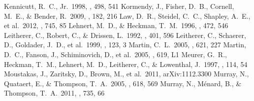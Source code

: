 \documentclass[apj]{emulateapj}
\begin{document}
\begin{thebibliography}{}
 Kennicutt, R.~C., Jr.\ 1998, \apj,
  498, 541
 Kormendy, J., Fisher, D.~B.,
  Cornell, M.~E., \& Bender, R.\ 2009, \apjs, 182, 216
 Law, D.~R., Steidel, C.~C., Shapley,
  A.~E., et al.\ 2012, \apj, 745, 85
 Lehnert, M.~D., \& Heckman,
  T.~M.\ 1996, \apj, 472, 546
 Leitherer, C., Robert, C., \&
  Drissen, L.\ 1992, \apj, 401, 596
 Leitherer, C., Schaerer, D.,
  Goldader, J.~D., et al.\ 1999, \apjs, 123, 3
 Martin, C.~L.\ 2005, \apj, 621, 227
 Martin, D.~C., Fanson, J.,
  Schiminovich, D., et al.\ 2005, \apjl, 619, L1
 Meurer, G.~R., Heckman, T.~M.,
  Lehnert, M.~D., Leitherer, C., \& Lowenthal, J.\ 1997, \aj, 114, 54
 Moustakas, J., Zaritsky, D.,
  Brown, M., et al.\ 2011, arXiv:1112.3300
 Murray, N., Quataert, E., \&
  Thompson, T.~A.\ 2005, \apj, 618, 569
 Murray, N., M{\'e}nard, B., \&
  Thompson, T.~A.\ 2011, \apj, 735, 66

\end{thebibliography}
\end{document}
